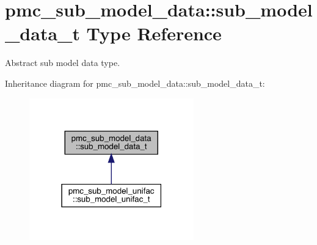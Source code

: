 \hypertarget{structpmc__sub__model__data_1_1sub__model__data__t}{}\section{pmc\+\_\+sub\+\_\+model\+\_\+data\+:\+:sub\+\_\+model\+\_\+data\+\_\+t Type Reference}
\label{structpmc__sub__model__data_1_1sub__model__data__t}


Abstract sub model data type.  




Inheritance diagram for pmc\+\_\+sub\+\_\+model\+\_\+data\+:\+:sub\+\_\+model\+\_\+data\+\_\+t\+:\nopagebreak
\begin{figure}[H]
\begin{center}
\leavevmode
\includegraphics[width=202pt]{structpmc__sub__model__data_1_1sub__model__data__t__inherit__graph}
\end{center}
\end{figure}
